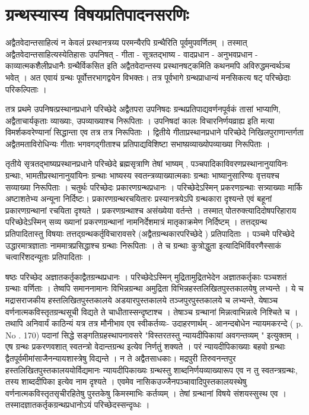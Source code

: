 \section{ग्रन्थस्यास्य विषयप्रतिपादनसरणिः}
अद्वैतवेदान्तसाहित्यं न केवलं प्रस्थानत्रय्य परमन्यैरपि ग्रन्थैरिति पूर्वमुपवर्णितम् । तस्मात् अद्वैतवेदान्तसाहित्यस्येतिहासः उपनिषत् - गीता - सूत्रतद्भाष्य - वादप्रधान - अनुभवप्रधान - काव्यात्मकशैलीप्रधानैः ग्रन्थैर्विकसित इति अद्वैतवेदान्तस्य प्रस्थानषट्कमिति कथनमपि अविरुद्धमन्वर्थञ्च भवेत् । अत एवायं ग्रन्थः पूर्वोत्तरभागद्वयेन विभक्तः। तत्र पूर्वभागे ग्रन्थप्राधान्यं मनसिकत्य षट् परिच्छेदाः परिकल्पिताः । 

तत्र प्रथमे उपनिषत्प्रस्थानप्रधाने परिच्छेदे अद्वैतपरा उपनिषदः ग्रन्थप्रतिपाद्यवर्णनपूर्वकं तासां भाप्याणि, अद्वैताचार्यकृताः व्याख्याः, उपव्याख्याश्च निरूपिताः । उपनिषदां कालः विचारनिर्णयव्राह्य इति मत्या विमर्शकवरेण्यानांं सिद्धान्ता एव तत्र तत्र निरूपिताः । 
द्वितीये गीताप्रस्थानप्रधाने परिच्छेदे निखिलपुराणान्तर्गता अद्वैतमताविरोधिन्यः गीताः भगवगद्गीताश्च प्रतिपाद्यविशिष्टा सभाष्य़व्याख्योपव्याख्या निरूपिताः । 

तृतीये सृत्रतद्भाष्यप्रस्थानप्रधाने परिच्छेदे ब्रह्मसृत्राणि तेषां भाष्यम् , पञ्चपादिकाविवरणप्रस्थानानुयायिनः ग्रन्थाः, भामतीप्रस्थानानुयांयिनः ग्रन्थाः भाष्यस्य स्वतन्त्रव्याख्यात्मकाः ग्रन्थाः भाष्यानुसारिण्यः वृत्तयश्च सव्याख्या निरूपिताः । 
चतुर्थः परिच्छेदः प्रकारणग्रन्थप्रधानः । परिच्छेदेऽस्मिन् प्रकरणग्रन्थाः सत्र्याख्याः मार्कि अष्टाशतेभ्य अन्यूना निर्दिष्टः। प्रकारणग्रन्थरचयितारः प्रस्यानत्रयेऽपि ग्रन्थकारा दृश्यन्ते एवं बहूनां प्रकारणग्रन्थानां रचयिता दृश्यते । प्रकरणग्रन्थाश्च असंख्येया वर्तन्ते । तस्मात् पोतरुक्त्यादिदोषपरिहाराय परिच्छेदेऽस्मिन् सव्य ख्यानां प्रकरणग्रन्थानां नामनिर्देशमात्रं मातृकाक्रमेण निर्दिष्टम् । तत्तद्ग्रन्थ प्रतिपादितास्तु विषयाः तत्तद्ग्रन्थकर्तृविचारावसरे (अद्वैतग्रन्थकारपरिच्छेदे ) प्रतिपादिताः । 
पञ्चमे परिच्छेदे उद्धारमात्रज्ञाताः नाममात्रप्रसिद्धाश्च ग्रन्थाः निरूपिताः । ते च ग्रन्थाः कुत्रोद्धुता इत्यादिभिर्विवरणैस्साकं चत्वारिंशदन्यूताः प्रतिपादिताः । 

षष्ठः परिच्छेद अज्ञातकर्तृकाद्वैतग्रन्थप्रधानः । परिच्छेदेऽस्मिन् मुद्रितामुद्रितभेदेन अज्ञातकर्तृकाः पञ्चशतं ग्रन्थाः वर्णिताः । तेष्वपि समाननामानः विभिन्नग्रन्था अमुद्रिता विभिन्नहस्तलिखितपुस्तकालयेषु लभ्यन्ते । ये च मद्रासराजकीय हस्तलिखितपुस्तकालये अडयारपुस्तकालये तञ्जपुरपुस्तकालये च लभ्यन्ते, येषाञ्च वर्णनात्मकविस्तृतग्रन्थसूची विद्यते ते चाधीतास्सन्दृष्टाश्च । तेषाञ्च ग्रन्थानां मिन्नत्वाभिन्नत्वे निश्चिते च । तथापि अनिवार्यं काठिन्यं यत्र तत्र मौनीभाव एव स्वीकर्तव्यः- उदाहरणार्थम् - आनन्दबोधेन न्यायमकरन्दे ( p. No . 170) पदानां सिद्धे सङ्गतिग्रहस्थापनावसरे "विस्तरतस्तु न्यायदीपिकायां अवगन्तव्यम् " इत्युक्तम् । एष ग्रन्थः प्रकरणवशात् स्वतन्त्रो वेदान्तग्रन्थ इत्येव निर्णतुं शक्यते । परं न्यायदीपिकाख्याः बहवो ग्रन्थाः द्वैतपूर्वमीमांसाजैनन्यायशास्त्रेषु विद्यन्ते । न ते अद्वैतसाधकाः। मद्रपुरी तिरुवनन्तपुर हस्तलिखितपुस्तकालययोर्विद्यमानः न्यायदीपिकाख्यः ग्रन्थस्तु शाब्दनिर्णयव्याख्यारूप एव न तु स्वतन्त्रग्रन्थः, तस्य शाब्ददीपिका इत्येव नाम दृश्यते । एवमेव नासिकउज्जैनपञ्चावादिपुस्तकालयस्थेषु वर्णनात्मकविस्तृतसृचीरहितेषु पुस्तकेषु किमस्माभिः कर्तव्यम् । तेषां ग्रन्थानां विषये संशयस्सुस्थ एव । तस्मादज्ञातकर्तृकग्रन्थप्रधानोऽयं परिच्छेदस्सन्दृव्धः । 

